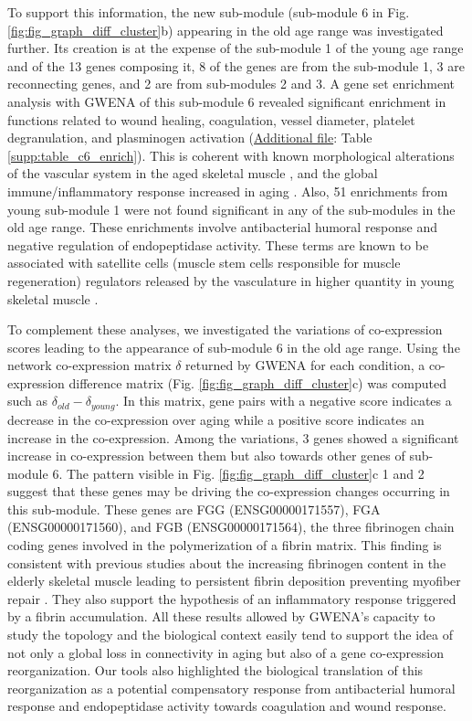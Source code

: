 To support this information, the new sub-module (sub-module 6 in Fig. \ref{fig:fig_graph_diff_cluster}b) appearing in the old age range was investigated further. Its creation is at the expense of the sub-module 1 of the young age range and of the 13 genes composing it, 8 of the genes are from the sub-module 1, 3 are reconnecting genes, and 2 are from sub-modules 2 and 3. A gene set enrichment analysis with GWENA of this sub-module 6 revealed significant enrichment in functions related to wound healing, coagulation, vessel diameter, platelet degranulation, and plasminogen activation (\hyperref[annexe:supp_file_GWENA]{Additional file}: Table \ref{supp:table_c6_enrich}). This is coherent with known morphological alterations of the vascular system in the aged skeletal muscle , and the global immune/inflammatory response increased in aging . Also, 51 enrichments from young sub-module 1 were not found significant in any of the sub-modules in the old age range. These enrichments involve antibacterial humoral response and negative regulation of endopeptidase activity. These terms are known to be associated with satellite cells (muscle stem cells responsible for muscle regeneration) regulators released by the vasculature in higher quantity in young skeletal muscle . 

To complement these analyses, we investigated the variations of co-expression scores leading to the appearance of sub-module 6 in the old age range. Using the network co-expression matrix $\delta$ returned by GWENA for each condition, a co-expression difference matrix (Fig. \ref{fig:fig_graph_diff_cluster}c) was computed such as $\delta_{old} - \delta_{young}$. In this matrix, gene pairs with a negative score indicates a decrease in the co-expression over aging while a positive score indicates an increase in the co-expression. Among the variations, 3 genes showed a significant increase in co-expression between them but also towards other genes of sub-module 6. The pattern visible in Fig. \ref{fig:fig_graph_diff_cluster}c \textcircled{\small{1}} and \textcircled{\small{2}} suggest that these genes may be driving the co-expression changes occurring in this sub-module. These genes are FGG (ENSG00000171557), FGA (ENSG00000171560), and FGB (ENSG00000171564), the three fibrinogen chain coding genes involved in the polymerization of a fibrin matrix. This finding is consistent with previous studies about the increasing fibrinogen content in the elderly skeletal muscle leading to persistent fibrin deposition preventing myofiber repair . They also support the hypothesis of an inflammatory response triggered by a fibrin accumulation. All these results allowed by GWENA's capacity to study the topology and the biological context easily tend to support the idea of not only a global loss in connectivity in aging but also of a gene co-expression reorganization. Our tools also highlighted the biological translation of this reorganization as a potential compensatory response from antibacterial humoral response and endopeptidase activity towards coagulation and wound response.


